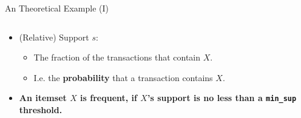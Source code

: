 \begin{frame}{An Theoretical Example (I)}
\begin{columns}
\begin{column}{0.5\textwidth}
\begin{itemize}
				\item (Relative) Support $s$:
				      \begin{itemize}
					      \item The fraction of the transactions that contain $X$.
					      \item I.e. the \textbf{probability} that a transaction
					            contains $X$.
				      \end{itemize}
				\item \textbf{An itemset $X$ is frequent, if $X$'s support is
					      no less than a \texttt{min\_sup} threshold.}
			\end{itemize}
		\end{column}
	\end{columns}
\end{frame}


